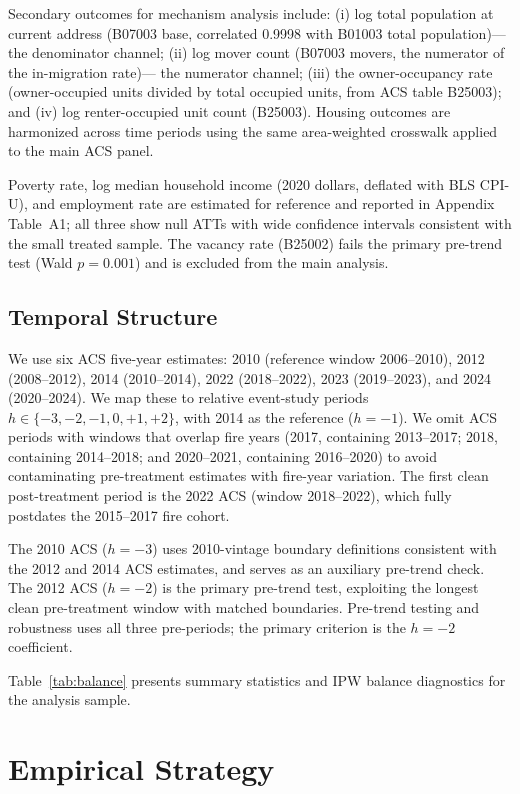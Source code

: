 \documentclass[12pt]{article}
\begin{document}
Secondary outcomes for mechanism analysis include:
(i) log total population at current address (B07003 base, correlated 0.9998
with B01003 total population)---the denominator channel;
(ii) log mover count (B07003 movers, the numerator of the in-migration rate)---
the numerator channel;
(iii) the owner-occupancy rate (owner-occupied units divided by total
occupied units, from ACS table B25003);
and (iv) log renter-occupied unit count (B25003).
Housing outcomes are harmonized across time periods using the same
area-weighted crosswalk applied to the main ACS panel.

Poverty rate, log median household income (2020 dollars, deflated with
BLS CPI-U), and employment rate are estimated for reference
and reported in Appendix Table~A1; all three show null ATTs
with wide confidence intervals consistent with the small treated sample.
The vacancy rate (B25002) fails the primary pre-trend test
(Wald $p = 0.001$) and is excluded from the main analysis.

\subsection{Temporal Structure}

We use six ACS five-year estimates: 2010 (reference window 2006--2010),
2012 (2008--2012), 2014 (2010--2014), 2022 (2018--2022),
2023 (2019--2023), and 2024 (2020--2024).
We map these to relative event-study periods
$h \in \{-3, -2, -1, 0, +1, +2\}$, with 2014 as the reference ($h = -1$).
We omit ACS periods with windows that overlap fire years
(2017, containing 2013--2017; 2018, containing 2014--2018;
and 2020--2021, containing 2016--2020) to avoid contaminating
pre-treatment estimates with fire-year variation.
The first clean post-treatment period is the 2022 ACS
(window 2018--2022), which fully postdates the 2015--2017 fire cohort.

The 2010 ACS ($h = -3$) uses 2010-vintage boundary definitions consistent
with the 2012 and 2014 ACS estimates, and serves as an
auxiliary pre-trend check.
The 2012 ACS ($h = -2$) is the primary pre-trend test,
exploiting the longest clean pre-treatment window with matched boundaries.
Pre-trend testing and robustness uses all three pre-periods;
the primary criterion is the $h = -2$ coefficient.

Table~\ref{tab:balance} presents summary statistics and IPW balance
diagnostics for the analysis sample.


\section{Empirical Strategy}
\label{sec:strategy}
\end{document}
